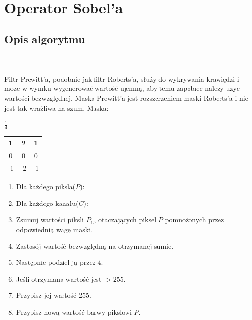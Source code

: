\documentclass[final,a4paper,openany,12pt]{mwbk}
\begin{document}
\newpage

\section{Operator Sobel'a}
\subsection*{Opis algorytmu}
\hfill
\\\\
\indent Filtr Prewitt'a, podobnie jak filtr Roberts'a, służy do wykrywania krawiędzi i może w wyniku wygenerować wartość ujemną, aby temu zapobiec należy użyc wartości bezwzględnej. Maska Prewitt'a jest rozszerzeniem maski Roberts'a i nie jest tak wrażliwa na szum. Maska:

\begin{center}
	$\frac{1}{4}$
	\begin{tabular}{|c|c|c|}
		\hline
		1 & 2 & 1\\
		\hline
		0 & 0 & 0\\
		\hline
		-1 & -2 & -1\\
		\hline
	\end{tabular}
\end{center}

\begin{enumerate}
	\item Dla każdego piksla($P$):
	\item Dla każdego kanału($C$):
	\item Zsumuj wartości piksli $P_C$, otaczających piksel $P$ pomnożonych przez odpowiednią wagę maski.
	\item Zastosój wartość bezwzględną na otrzymanej sumie.
	\item Następnie podziel ją przez 4.
	\item Jeśli otrzymana wartość jest $> 255$.
	\item Przypisz jej wartość 255.
	\item Przypisz nową wartość barwy pikslowi $P$.
\end{enumerate}
\end{document}
